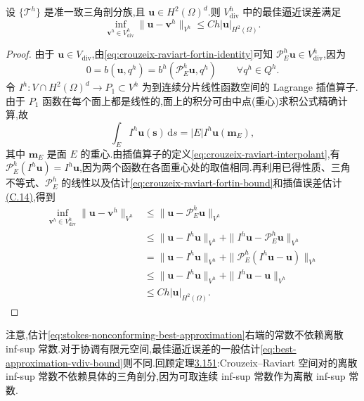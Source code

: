 \begin{lemma}\label{lem:stokes-nonconforming-best-approximation}
设 $\{\mathcal{T}^h\}$ 是准一致三角剖分族,且 $\bm{u}\in H^2(\Omega)^d$.则 $V_{\mathrm{div}}^h$ 中的最佳逼近误差满足
\begin{equation}\label{eq:stokes-nonconforming-best-approximation}
  \inf_{\bm{v}^h\in V_{\mathrm{div}}^h}
      \|\bm{u}-\bm{v}^h\|_{V^h}
  \leq Ch|\bm{u}|_{H^2(\Omega)}.
\end{equation}
\end{lemma}
\begin{proof}
由于 $\bm{u}\in V_{\mathrm{div}}$,由\cref{eq:crouzeix-raviart-fortin-identity}可知 $\mathcal{P}_E^h\bm{u}\in V_{\mathrm{div}}^h$,因为
\[
  0=b(\bm{u},q^h)
   =b^h(\mathcal{P}_E^h\bm{u},q^h)
  \qquad\forall q^h\in Q^h.
\]
令 $I^h:V\cap H^2(\Omega)^d\to P_1\subset V^h$ 为到连续分片线性函数空间的 Lagrange 插值算子.由于 $P_1$ 函数在每个面上都是线性的,面上的积分可由中点(重心)求积公式精确计算,故
\[
  \int_E I^h\bm{u}(\bm{s})\,\mathrm{d}s
  =|E|I^h\bm{u}(\bm{m}_E),
\]
其中 $\bm{m}_E$ 是面 $E$ 的重心.由插值算子的定义\cref{eq:crouzeix-raviart-interpolant},有 $\mathcal{P}_E^h(I^h\bm{u})=I^h\bm{u}$,因为两个函数在各面重心处的取值相同.再利用已得性质、三角不等式、$\mathcal{P}_E^h$ 的线性以及估计\cref{eq:crouzeix-raviart-fortin-bound}和插值误差估计\hyperref[eq:interpolation-error-estimate]{(C.14)},得到
\[
\begin{aligned}
  \inf_{\bm{v}^h\in V_{\mathrm{div}}^h}
      \|\bm{u}-\bm{v}^h\|_{V^h}
  &\leq\|\bm{u}-\mathcal{P}_E^h\bm{u}\|_{V^h}\\
  &\leq\|\bm{u}-I^h\bm{u}\|_{V^h}
      +\|I^h\bm{u}-\mathcal{P}_E^h\bm{u}\|_{V^h}\\
  &=\|\bm{u}-I^h\bm{u}\|_{V^h}
      +\|\mathcal{P}_E^h(I^h\bm{u}-\bm{u})\|_{V^h}\\
  &\leq\|\bm{u}-I^h\bm{u}\|_{V^h}
      +\|I^h\bm{u}-\bm{u}\|_{V^h}\\
  &\leq Ch|\bm{u}|_{H^2(\Omega)}.
\end{aligned}
\]
\end{proof}

\begin{note}\label{note:stokes-nonconforming-best-approximation}
注意,估计\cref{eq:stokes-nonconforming-best-approximation}右端的常数不依赖离散 inf-sup 常数.对于协调有限元空间,最佳逼近误差的一般估计\cref{eq:best-approximation-vdiv-bound}则不同.回顾定理\hyperref[thm:crouzeix-raviart-infsup]{3.151}:Crouzeix--Raviart 空间对的离散 inf-sup 常数不依赖具体的三角剖分,因为可取连续 inf-sup 常数作为离散 inf-sup 常数.
\end{note}

